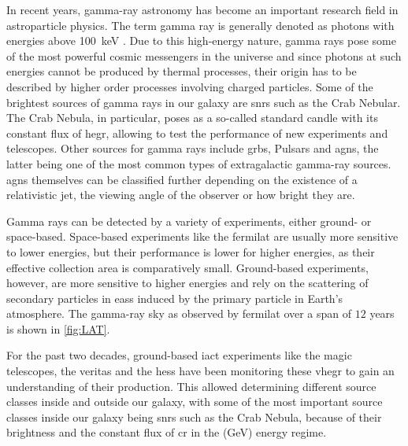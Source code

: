 In recent years, gamma-ray astronomy has become an important research field in astroparticle physics.
The term gamma ray is generally denoted as photons with energies above \SI{100}{\kilo\eV}
\cite{funk}. Due to this high-energy nature, gamma rays pose some of the most powerful cosmic messengers in
the universe and since photons at such energies cannot be produced by thermal processes, their origin
has to be described by higher order processes involving charged particles.
Some of the brightest sources of gamma rays in our galaxy are \glspl{snr} such as the Crab Nebular.
The Crab Nebula, in particular, poses as a so-called standard candle with its constant flux of
\gls{hegr}, allowing to test the performance of new experiments and telescopes. Other sources for
gamma rays include \glspl{grb}, Pulsars and \glspl{agn}, the latter being one of the most common types
of extragalactic gamma-ray sources.
\glspl{agn} themselves can be classified further depending on the existence
of a relativistic jet, the viewing angle of the observer or how bright they are.

Gamma rays can be detected by a variety of experiments, either ground- or space-based. Space-based
experiments like the \gls{fermilat} are usually more sensitive to lower energies, but their performance
is lower for higher energies, as their effective collection area is comparatively small. Ground-based
experiments, however, are more sensitive to higher energies and rely on the scattering
of secondary particles in \glspl{eas} induced by the primary particle in Earth's atmosphere.
The gamma-ray sky as observed by \gls{fermilat} over a span of
\(\num{12}\) years is shown in \autoref{fig:LAT}.

For the past two decades, ground-based \gls{iact} experiments like the \gls{magic} telescopes, the
\gls{veritas} and the \gls{hess} have been monitoring these \gls{vhegr} to gain an understanding of
their production. This allowed determining different source classes inside and outside our galaxy,
with some of the most important source classes inside our galaxy being \glspl{snr} such as the Crab Nebula,
because of their brightness and the constant flux of \gls{cr} in the (\si{\giga\eV}) energy regime.





